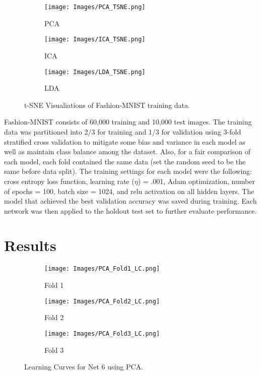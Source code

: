 \documentclass[conference]{IEEEtran}
\begin{document}
	\begin{figure*}[htb]
	\begin{subfigure}{.32\textwidth}{
			\texttt{[image: Images/PCA\_TSNE.png]}
			\caption{PCA}
			\label{fig:PCA}
		}
	\end{subfigure}
	\begin{subfigure}{.32\textwidth}{
			\texttt{[image: Images/ICA\_TSNE.png]}
			\caption{ICA}
			\label{fig:ICA}
		}
	\end{subfigure}
	\begin{subfigure}{.32\textwidth}{
			\texttt{[image: Images/LDA\_TSNE.png]}
			\caption{LDA}
			\label{fig:LDA}
		}
	\end{subfigure} 
	
	\caption{t-SNE Visualiations of Fashion-MNIST training data.}
	\centering
	\label{fig:tsne}
\end{figure*} 

	Fashion-MNIST consists of 60,000 training and 10,000 test images. The training data was partitioned into 2/3 for training and 1/3 for validation using 3-fold stratified cross validation to mitigate some bias and variance in each model as well as maintain class balance among the dataset. Also, for a fair comparison of each model, each fold contained the same data (set the random seed to be the same before data split). The training settings for each model were the following: cross entropy loss function, learning rate ($\eta$) = .001, Adam\cite{kingma2014adam} optimization, number of epochs = 100, batch size = 1024, and relu activation on all hidden layers. The model that achieved the best validation accuracy was saved during training. Each network was then applied to the holdout test set to further evaluate performance.
	  
\section{Results}

\begin{figure*}[t]
	\begin{subfigure}{.32\textwidth}{
			\texttt{[image: Images/PCA\_Fold1\_LC.png]}
			\caption{Fold 1}
			\label{fig:Fold1LC}
		}
	\end{subfigure}
	\begin{subfigure}{.32\textwidth}{
			\texttt{[image: Images/PCA\_Fold2\_LC.png]}
			\caption{Fold 2}
			\label{fig:Fold2LC}
		}
	\end{subfigure}
	\begin{subfigure}{.32\textwidth}{
			\texttt{[image: Images/PCA\_Fold3\_LC.png]}
			\caption{Fold 3}
			\label{fig:Fold3LC}
		}
	\end{subfigure} 
	
	\caption{Learning Curves for Net 6 using PCA.}
	\centering
	\label{fig:LC}
\end{figure*} 
\end{document}
